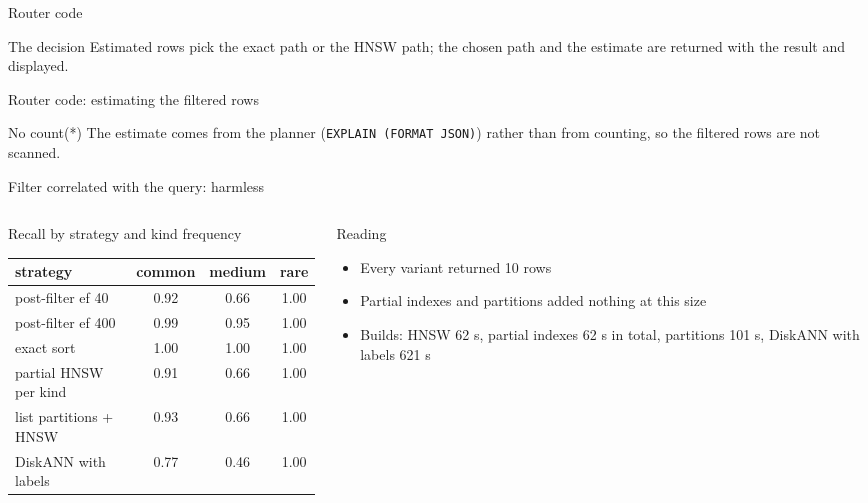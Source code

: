 \documentclass[aspectratio=169,10pt]{beamer}
\newcommand{\code}[1]{\texttt{\footnotesize #1}}
\newcommand{\listing}[1]{}
\newcommand{\listingr}[3]{}
\begin{document}
\begin{frame}{Router code}
\begin{block}{The decision}
Estimated rows pick the exact path or the HNSW path; the chosen path and the estimate are returned with the result and displayed.
\end{block}
\vspace{0.3em}
\listing{code-router-choice}
\end{frame}

\begin{frame}{Router code: estimating the filtered rows}
\begin{block}{No count(*)}
The estimate comes from the planner (\code{EXPLAIN (FORMAT JSON)}) rather than from counting, so the filtered rows are not scanned.
\end{block}
\vspace{0.3em}
\listingr{code-router}{1}{8}
\end{frame}

\begin{frame}[shrink=5]{Filter correlated with the query: harmless}
\begin{columns}[T]
\begin{column}{0.55\textwidth}
\begin{block}{Recall by strategy and kind frequency}
\begin{tabular}{@{}lccc@{}}
\toprule
strategy & common & medium & rare\\
\midrule
post-filter ef 40 & 0.92 & 0.66 & 1.00\\
post-filter ef 400 & 0.99 & 0.95 & 1.00\\
exact sort & 1.00 & 1.00 & 1.00\\
partial HNSW per kind & 0.91 & 0.66 & 1.00\\
list partitions + HNSW & 0.93 & 0.66 & 1.00\\
DiskANN with labels & 0.77 & 0.46 & 1.00\\
\bottomrule
\end{tabular}
\end{block}
\end{column}
\begin{column}{0.43\textwidth}
\begin{block}{Reading}
\begin{itemize}
  \item Every variant returned 10 rows
  \item Partial indexes and partitions added nothing at this size
  \item Builds: HNSW 62 s, partial indexes 62 s in total, partitions 101 s, DiskANN with labels 621 s
\end{itemize}
\end{block}
\end{column}
\end{columns}
\end{frame}
\end{document}
